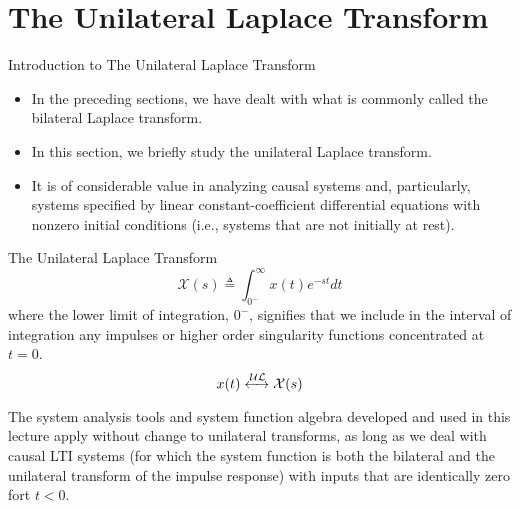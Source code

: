 \section{The Unilateral Laplace Transform}

\begin{frame}{Introduction to The Unilateral Laplace Transform}
    \begin{itemize}
      \item In the preceding sections, we have dealt with what is commonly called the bilateral Laplace transform.
      \item In this section, we briefly study the unilateral Laplace transform.
      \item  It is of considerable value in analyzing causal systems and, particularly, systems specified by linear constant-coefficient differential equations with nonzero initial conditions (i.e., systems that are not initially at rest).
    \end{itemize}
    
\end{frame}
    
    
\begin{frame}{The Unilateral Laplace Transform}    
    \begin{equation*}
        \mathcal{X}(s) \triangleq \int_{0^{-}}^{\infty}x(t)e^{-st}dt
    \end{equation*}
    where the lower limit of integration, $0^{-}$, signifies that we include in the interval of integration any impulses or higher order singularity functions concentrated at $t = 0$.
    \begin{equation*}
        x(t) \xleftrightarrow{\mathcal{UL}} \mathcal{X}(s)
    \end{equation*}    

    \pause
    {
    }
    
    The system analysis tools and system function algebra developed and used in this lecture apply without change to unilateral transforms, \alert{as long
as we deal with causal LTI systems (for which the system function is both the bilateral and the unilateral transform of the impulse response) with inputs that are identically zero
fort $t< 0$}.
\end{frame}



